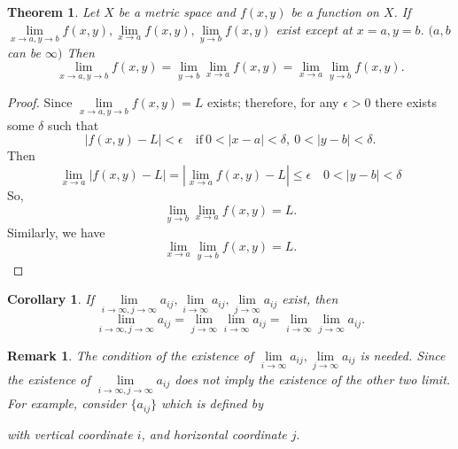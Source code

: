 \documentclass{book}
\newtheorem{thm}[defi]{Theorem}
\newtheorem{cor}[defi]{Corollary}
\newtheorem*{remark}{Remark}
\numberwithin{equation}{section}
\begin{document}
\begin{thm} Let $X$ be a metric space and $f(x,y)$ be a function on $X$.
If $\lim\limits_{x\rightarrow a, y\rightarrow b}f(x,y), \lim\limits_{x\rightarrow a}f(x,y), \lim\limits_{y\rightarrow b}f(x,y)$ exist except at $x=a,y=b.$ $(a,b$ can be $\infty)$ Then
$$
\lim\limits_{x\rightarrow a, y\rightarrow b}f(x,y)=\lim\limits_{y\rightarrow b}\lim\limits_{x\rightarrow a}f(x,y)=\lim\limits_{x\rightarrow a}\lim\limits_{y\rightarrow b}f(x,y).
$$
\end{thm}
\begin{proof}
Since $\lim\limits_{x\rightarrow a, y\rightarrow b}f(x,y)=L$ exists;  therefore, for any $\epsilon >0$ there exists some $\delta$ such that 
$$
|f(x,y)-L|<\epsilon \quad \text{if} \ 0<|x-a|<\delta, \ 0<|y-b|<\delta.
$$ Then
$$
\lim_{x\rightarrow a}|f(x,y)-L|=|\lim_{x\rightarrow a}f(x,y)-L|\leq \epsilon \quad 0<|y-b|<\delta
$$ So,
$$
\lim\limits_{y\rightarrow b}\lim\limits_{x\rightarrow a}f(x,y)=L.
$$ Similarly, we have
$$
\lim\limits_{x\rightarrow a}\lim\limits_{y\rightarrow b}f(x,y)=L.
$$
\end{proof}

\begin{cor}
If $\lim\limits_{i\rightarrow \infty, j\rightarrow \infty}a_{ij}, \lim\limits_{i\rightarrow \infty}a_{ij}, \lim\limits_{j\rightarrow \infty}a_{ij}$ exist, then
$$
\lim\limits_{i\rightarrow \infty, j\rightarrow \infty}a_{ij}=\lim_{j \rightarrow \infty} \lim_{i \rightarrow \infty} a_{ij}=\lim_{i \rightarrow \infty} \lim_{j \rightarrow \infty} a_{ij}.
$$
\end{cor}

\begin{remark}
The condition of the existence of $\lim\limits_{i\rightarrow \infty}a_{ij}, \lim\limits_{j\rightarrow \infty}a_{ij}$ is needed. Since the existence of $\lim\limits_{i\rightarrow \infty, j\rightarrow \infty}a_{ij}$ does not imply the existence of the other two limit. For example, consider $\{a_{ij}\}$ which is defined by \medskip

 \medskip

with vertical coordinate $i$, and horizontal coordinate $j.$
\end{remark}
\end{document}
